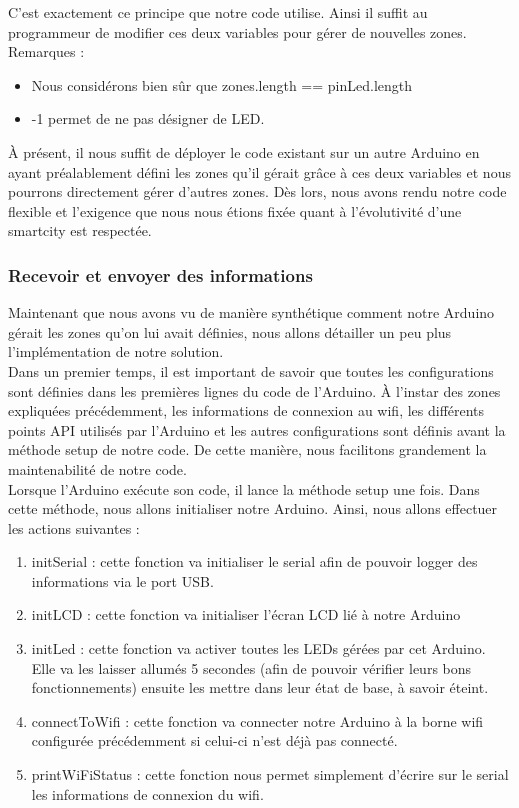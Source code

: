 C’est exactement ce principe que notre code utilise. Ainsi il suffit au programmeur de modifier ces deux variables pour gérer de nouvelles zones.\\

Remarques : 
\begin{itemize}
\item Nous considérons bien sûr que zones.length == pinLed.length
\item -1 permet de ne pas désigner de LED.\\
\end{itemize}

À présent, il nous suffit de déployer le code existant sur un autre Arduino en ayant préalablement défini les zones qu’il gérait grâce à ces deux variables et nous pourrons directement gérer d’autres zones. Dès lors, nous avons rendu notre code flexible et l’exigence que nous nous étions fixée quant à l’évolutivité d’une smartcity est respectée. 

\subsubsection{Recevoir et envoyer des informations}
Maintenant que nous avons vu de manière synthétique comment notre Arduino gérait les zones qu’on lui avait définies, nous allons détailler un peu plus l’implémentation de notre solution. \\

Dans un premier temps, il est important de savoir que toutes les configurations sont définies dans les premières lignes du code de l’Arduino. À l’instar des zones expliquées précédemment, les informations de connexion au wifi, les différents points API utilisés par l’Arduino et les autres configurations sont définis avant la méthode setup de notre code. De cette manière, nous facilitons grandement la maintenabilité de notre code. \\

Lorsque l’Arduino exécute son code, il lance la méthode setup une fois. Dans cette méthode, nous allons initialiser notre Arduino. Ainsi, nous allons effectuer les actions suivantes : 

\begin{enumerate}
\item initSerial : cette fonction va initialiser le serial afin de pouvoir logger des informations via le port USB.
\item initLCD : cette fonction va initialiser l’écran LCD lié à notre Arduino
\item initLed : cette fonction va activer toutes les LEDs gérées par cet Arduino. Elle va les laisser allumés 5 secondes (afin de pouvoir vérifier leurs bons fonctionnements) ensuite les mettre dans leur état de base, à savoir éteint. 
\item connectToWifi : cette fonction va connecter notre Arduino à la borne wifi configurée précédemment si celui-ci n’est déjà pas connecté. 
\item printWiFiStatus : cette fonction nous permet simplement d’écrire sur le serial les informations de connexion du wifi.\\
\end{enumerate}

